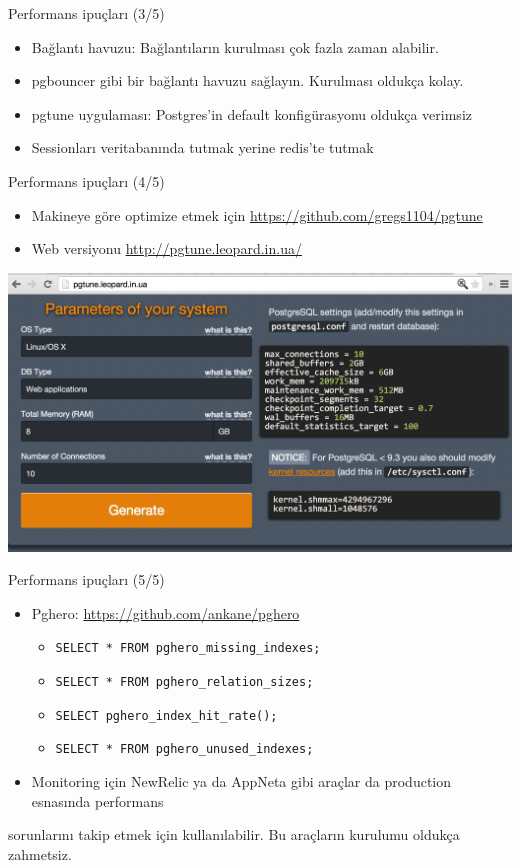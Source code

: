 \documentclass[presentation]{beamer}
\begin{document}
\begin{frame}[label=sec-14]{Performans ipuçları (3/5)}
\begin{itemize}
\item Bağlantı havuzu: Bağlantıların kurulması çok fazla zaman alabilir.
\item pgbouncer gibi bir bağlantı havuzu sağlayın. Kurulması oldukça kolay.
\item pgtune uygulaması: Postgres'in default konfigürasyonu oldukça verimsiz
\item Sessionları veritabanında tutmak yerine redis'te tutmak
\end{itemize}
\end{frame}

\begin{frame}[label=sec-15]{Performans ipuçları (4/5)}
\begin{itemize}
\item Makineye göre optimize etmek için \url{https://github.com/gregs1104/pgtune}
\item Web versiyonu \url{http://pgtune.leopard.in.ua/}
\end{itemize}

\includegraphics[width=.9\linewidth]{./pgtune.png}
\end{frame}


\begin{frame}[fragile,label=sec-16]{Performans ipuçları (5/5)}
 \begin{itemize}
\item Pghero: \url{https://github.com/ankane/pghero}
\begin{itemize}
\item \texttt{SELECT * FROM pghero\_missing\_indexes;}
\item \texttt{SELECT * FROM pghero\_relation\_sizes;}
\item \texttt{SELECT pghero\_index\_hit\_rate();}
\item \texttt{SELECT * FROM pghero\_unused\_indexes;}
\end{itemize}
\item Monitoring için NewRelic ya da AppNeta gibi araçlar da production esnasında performans
\end{itemize}
sorunlarını takip etmek için kullanılabilir. Bu araçların kurulumu oldukça
zahmetsiz.
\end{frame}
\end{document}
